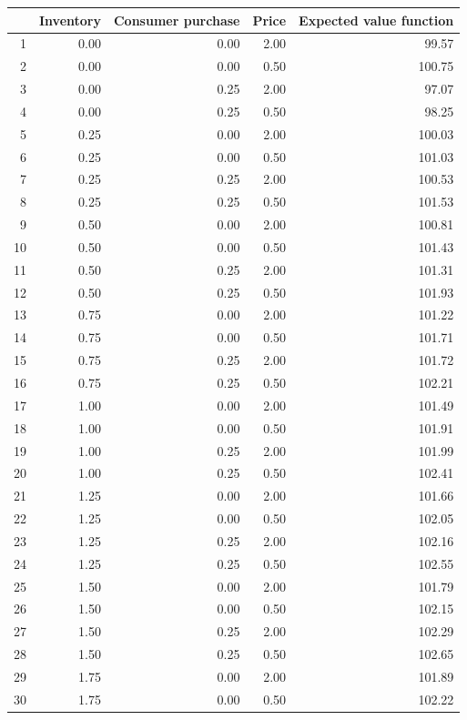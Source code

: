 \begin{tabular}{rrrrr}
  \hline
 & Inventory & Consumer purchase & Price & Expected value function \\ 
  \hline
1 & 0.00 & 0.00 & 2.00 & 99.57 \\ 
  2 & 0.00 & 0.00 & 0.50 & 100.75 \\ 
  3 & 0.00 & 0.25 & 2.00 & 97.07 \\ 
  4 & 0.00 & 0.25 & 0.50 & 98.25 \\ 
  5 & 0.25 & 0.00 & 2.00 & 100.03 \\ 
  6 & 0.25 & 0.00 & 0.50 & 101.03 \\ 
  7 & 0.25 & 0.25 & 2.00 & 100.53 \\ 
  8 & 0.25 & 0.25 & 0.50 & 101.53 \\ 
  9 & 0.50 & 0.00 & 2.00 & 100.81 \\ 
  10 & 0.50 & 0.00 & 0.50 & 101.43 \\ 
  11 & 0.50 & 0.25 & 2.00 & 101.31 \\ 
  12 & 0.50 & 0.25 & 0.50 & 101.93 \\ 
  13 & 0.75 & 0.00 & 2.00 & 101.22 \\ 
  14 & 0.75 & 0.00 & 0.50 & 101.71 \\ 
  15 & 0.75 & 0.25 & 2.00 & 101.72 \\ 
  16 & 0.75 & 0.25 & 0.50 & 102.21 \\ 
  17 & 1.00 & 0.00 & 2.00 & 101.49 \\ 
  18 & 1.00 & 0.00 & 0.50 & 101.91 \\ 
  19 & 1.00 & 0.25 & 2.00 & 101.99 \\ 
  20 & 1.00 & 0.25 & 0.50 & 102.41 \\ 
  21 & 1.25 & 0.00 & 2.00 & 101.66 \\ 
  22 & 1.25 & 0.00 & 0.50 & 102.05 \\ 
  23 & 1.25 & 0.25 & 2.00 & 102.16 \\ 
  24 & 1.25 & 0.25 & 0.50 & 102.55 \\ 
  25 & 1.50 & 0.00 & 2.00 & 101.79 \\ 
  26 & 1.50 & 0.00 & 0.50 & 102.15 \\ 
  27 & 1.50 & 0.25 & 2.00 & 102.29 \\ 
  28 & 1.50 & 0.25 & 0.50 & 102.65 \\ 
  29 & 1.75 & 0.00 & 2.00 & 101.89 \\ 
  30 & 1.75 & 0.00 & 0.50 & 102.22 \\ 

\end{tabular}
